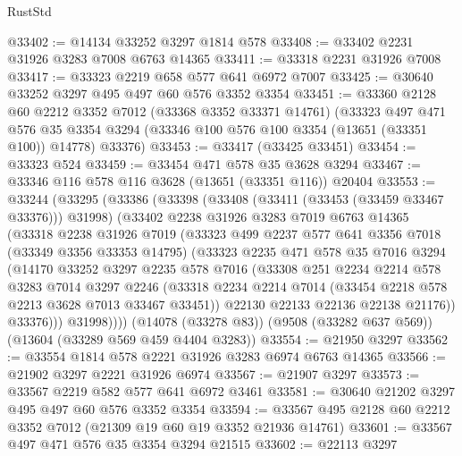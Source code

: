 \begin{lexlean}{RustStd}
\begin{coremodule}
@33402 := @14134 @33252 @3297 @1814 @578
@33408 := @33402 @2231 @31926 @3283 @7008 @6763 @14365
@33411 := @33318 @2231 @31926 @7008
@33417 := @33323 @2219 @658 @577 @641 @6972 @7007
@33425 := @30640 @33252 @3297 @495 @497 @60 @576 @3352 @3354
@33451 := @33360
    @2128
    @60
    @2212
    @3352
    @7012
    (@33368 @3352 @33371 @14761)
    (@33323
      @497
      @471
      @576
      @35
      @3354
      @3294
      (@33346 @100 @576 @100 @3354 (@13651 (@33351 @100)) @14778)
      @33376)
@33453 := @33417 (@33425 @33451)
@33454 := @33323 @524
@33459 := @33454 @471 @578 @35 @3628 @3294
@33467 := @33346 @116 @578 @116 @3628 (@13651 (@33351 @116)) @20404
@33553 := @33244
    (@33295
      (@33386
        (@33398
          (@33408 (@33411 (@33453 (@33459 @33467 @33376))) @31998)
          (@33402
            @2238
            @31926
            @3283
            @7019
            @6763
            @14365
            (@33318
              @2238
              @31926
              @7019
              (@33323
                @499
                @2237
                @577
                @641
                @3356
                @7018
                (@33349 @3356 @33353 @14795)
                (@33323
                  @2235
                  @471
                  @578
                  @35
                  @7016
                  @3294
                  (@14170
                    @33252
                    @3297
                    @2235
                    @578
                    @7016
                    (@33308
                      @251
                      @2234
                      @2214
                      @578
                      @3283
                      @7014
                      @3297
                      @2246
                      (@33318 @2234 @2214 @7014 (@33454 @2218 @578 @2213 @3628 @7013 @33467 @33451))
                      @22130
                      @22133
                      @22136
                      @22138
                      @21176))
                  @33376)))
            @31998))))
    (@14078 (@33278 @83))
    (@9508 (@33282 @637 @569))
    (@13604 (@33289 @569 @459 @4404 @3283))
@33554 := @21950 @3297
@33562 := @33554 @1814 @578 @2221 @31926 @3283 @6974 @6763 @14365
@33566 := @21902 @3297 @2221 @31926 @6974
@33567 := @21907 @3297
@33573 := @33567 @2219 @582 @577 @641 @6972 @3461
@33581 := @30640 @21202 @3297 @495 @497 @60 @576 @3352 @3354
@33594 := @33567 @495 @2128 @60 @2212 @3352 @7012 (@21309 @19 @60 @19 @3352 @21936 @14761)
@33601 := @33567 @497 @471 @576 @35 @3354 @3294 @21515
@33602 := @22113 @3297

\end{coremodule}
\end{lexlean}
